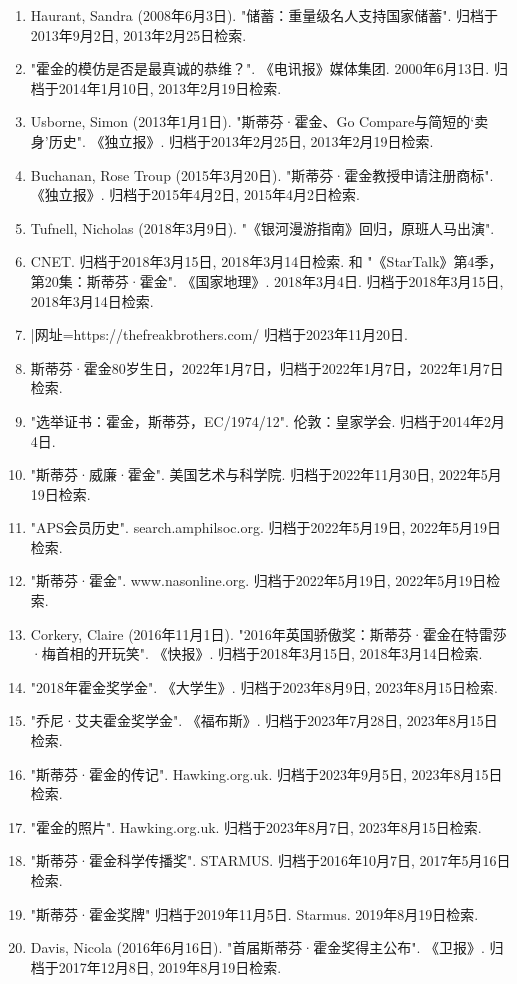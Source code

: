 \begin{enumerate}
\item Haurant, Sandra (2008年6月3日). "储蓄：重量级名人支持国家储蓄". 归档于2013年9月2日, 2013年2月25日检索.
\item "霍金的模仿是否是最真诚的恭维？". 《电讯报》媒体集团. 2000年6月13日. 归档于2014年1月10日, 2013年2月19日检索.
\item Usborne, Simon (2013年1月1日). "斯蒂芬·霍金、Go Compare与简短的‘卖身’历史". 《独立报》. 归档于2013年2月25日, 2013年2月19日检索.
\item Buchanan, Rose Troup (2015年3月20日). "斯蒂芬·霍金教授申请注册商标". 《独立报》. 归档于2015年4月2日, 2015年4月2日检索.
\item Tufnell, Nicholas (2018年3月9日). "《银河漫游指南》回归，原班人马出演". \item CNET. 归档于2018年3月15日, 2018年3月14日检索. 和 "《StarTalk》第4季，第20集：斯蒂芬·霍金". 《国家地理》. 2018年3月4日. 归档于2018年3月15日, 2018年3月14日检索.
\item |网址=https://thefreakbrothers.com/ 归档于2023年11月20日.
\item 斯蒂芬·霍金80岁生日，2022年1月7日，归档于2022年1月7日，2022年1月7日检索.
\item "选举证书：霍金，斯蒂芬，EC/1974/12". 伦敦：皇家学会. 归档于2014年2月4日.
\item "斯蒂芬·威廉·霍金". 美国艺术与科学院. 归档于2022年11月30日, 2022年5月19日检索.
\item "APS会员历史". search.amphilsoc.org. 归档于2022年5月19日, 2022年5月19日检索.
\item "斯蒂芬·霍金". www.nasonline.org. 归档于2022年5月19日, 2022年5月19日检索.
\item Corkery, Claire (2016年11月1日). "2016年英国骄傲奖：斯蒂芬·霍金在特雷莎·梅首相的开玩笑". 《快报》. 归档于2018年3月15日, 2018年3月14日检索.
\item "2018年霍金奖学金". 《大学生》. 归档于2023年8月9日, 2023年8月15日检索.
\item "乔尼·艾夫霍金奖学金". 《福布斯》. 归档于2023年7月28日, 2023年8月15日检索.
\item "斯蒂芬·霍金的传记". Hawking.org.uk. 归档于2023年9月5日, 2023年8月15日检索.
\item "霍金的照片". Hawking.org.uk. 归档于2023年8月7日, 2023年8月15日检索.
\item "斯蒂芬·霍金科学传播奖". STARMUS. 归档于2016年10月7日, 2017年5月16日检索.
\item "斯蒂芬·霍金奖牌" 归档于2019年11月5日. Starmus. 2019年8月19日检索.
\item Davis, Nicola (2016年6月16日). "首届斯蒂芬·霍金奖得主公布". 《卫报》. 归档于2017年12月8日, 2019年8月19日检索.

\end{enumerate}
